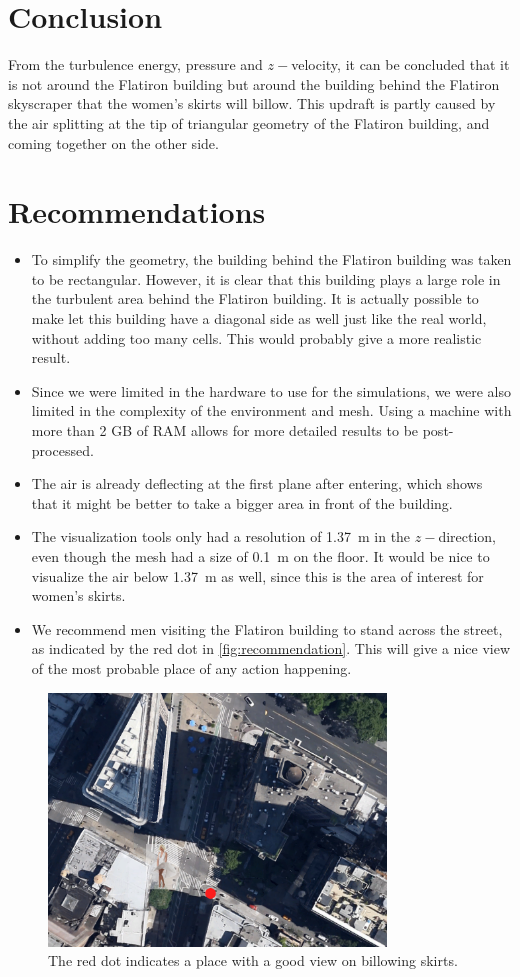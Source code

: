 \section{Conclusion}
From the turbulence energy, pressure and $z-$velocity, it can be concluded that it is not around the Flatiron building but around the building behind the Flatiron skyscraper that the women's skirts will billow. This updraft is partly caused by the air splitting at the tip of triangular geometry of the Flatiron building, and coming together on the other side. 

\section{Recommendations}
\begin{itemize}
\item To simplify the geometry, the building behind the Flatiron building was taken to be rectangular. However, it is clear that this building plays a large role in the turbulent area behind the Flatiron building. It is actually possible to make let this building have a diagonal side as well just like the real world, without adding too many cells. This would probably give a more realistic result.

\item Since we were limited in the hardware to use for the simulations, we were also limited in the complexity of the environment and mesh. Using a machine with more than 2 GB of RAM allows for more detailed results to be post-processed. 

\item The air is already deflecting at the first plane after entering, which shows that it might be better to take a bigger area in front of the building. 

\item The visualization tools only had a resolution of 1.37~m in the $z-$direction, even though the mesh had a size of 0.1~m on the floor. It would be nice to visualize the air below 1.37~m as well, since this is the area of interest for women's skirts. 

\item We recommend men visiting the Flatiron building to stand across the street, as indicated by the red dot in \autoref{fig:recommendation}. This will give a nice view of the most probable place of any action happening. 
\end{itemize}

\begin{figure}[htbp]
	\centering
		\includegraphics[width=0.80\textwidth]{recommendation.png}
	\caption{The red dot indicates a place with a good view on billowing skirts.}
	\label{fig:recommendation}
\end{figure}
